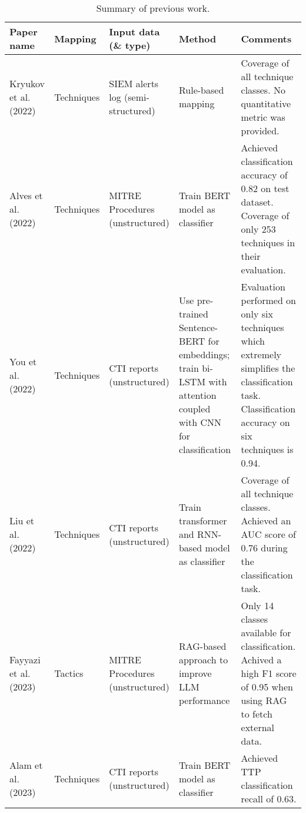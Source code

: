 \begin{table*}[h]
\renewcommand{\arraystretch}{1.5} %
\centering
\footnotesize
\caption{Summary of previous work.}

\begin{tabular}{|>{\raggedright\arraybackslash}p{2cm}|>{\raggedright\arraybackslash}p{1.4cm}|>{\raggedright\arraybackslash}p{2.5cm}|>{\raggedright\arraybackslash}p{4.7cm}|>{\raggedright\arraybackslash}p{5.8cm}|}
\hline
\textbf{Paper name} & \textbf{Mapping} & \textbf{Input data (\& type)} & \textbf{Method} & \textbf{Comments}\\ \hline
Kryukov et al.~\cite{kryukov2022mapping} (2022) & Techniques & SIEM alerts log (semi-structured) & Rule-based mapping & Coverage of all technique classes. No quantitative metric was provided.\\ \hline

Alves et al.~\cite{alves2022leveraging} (2022) & Techniques & MITRE Procedures (unstructured) & Train BERT model as classifier & Achieved classification accuracy of 0.82 on test dataset. Coverage of only 253 techniques in their evaluation. \\ \hline

You et al.~\cite{you2022tim} (2022) & Techniques & CTI reports (unstructured) & Use pre-trained Sentence-BERT for embeddings; train bi-LSTM with attention coupled with CNN for classification & Evaluation performed on only six techniques which extremely simplifies the classification task. Classification accuracy on six techniques is 0.94. \\ \hline

Liu et al.~\cite{liu2022threat} (2022) & Techniques & CTI reports (unstructured) & Train transformer and RNN-based model as classifier & Coverage of all technique classes. Achieved an AUC score of 0.76 during the classification task.\\ \hline

Fayyazi et al.~\cite{fayyazi2023advancing} (2023) & Tactics & MITRE Procedures (unstructured) & RAG-based approach to improve LLM performance & Only 14 classes available for classification. Achived a high F1 score of 0.95 when using RAG to fetch external data.\\ \hline

Alam et al.~\cite{alam2023looking} (2023) & Techniques & CTI reports (unstructured) & Train BERT model as classifier & Achieved TTP classification recall of 0.63. \\ \hline


\end{tabular}
\end{table*}
